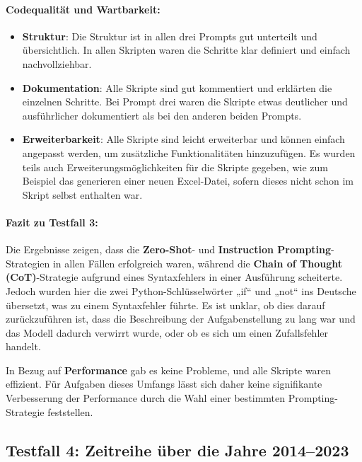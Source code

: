 \documentclass[11pt,a4paper]{article}
\begin{document}
\paragraph{Codequalität und Wartbarkeit:}
\begin{itemize}
    \item \textbf{Struktur}: Die Struktur ist in allen drei Prompts gut unterteilt und übersichtlich. In allen Skripten waren die Schritte klar definiert und einfach nachvollziehbar.
    \item \textbf{Dokumentation}: Alle Skripte sind gut kommentiert und erklärten die einzelnen Schritte. Bei Prompt drei waren die Skripte etwas deutlicher und ausführlicher dokumentiert als bei den anderen beiden Prompts.
    \item \textbf{Erweiterbarkeit}: Alle Skripte sind leicht erweiterbar und können einfach angepasst werden, um zusätzliche Funktionalitäten hinzuzufügen. Es wurden teils auch Erweiterungsmöglichkeiten für die Skripte gegeben, wie zum Beispiel das generieren einer neuen Excel-Datei, sofern dieses nicht schon im Skript selbst enthalten war. 
\end{itemize}

\paragraph{Fazit zu Testfall 3:}
Die Ergebnisse zeigen, dass die \textbf{Zero-Shot}- und \textbf{Instruction Prompting}-Strategien in allen Fällen erfolgreich waren, während die \textbf{Chain of Thought (CoT)}-Strategie aufgrund eines Syntaxfehlers in einer Ausführung scheiterte. Jedoch wurden hier die zwei Python-Schlüsselwörter „if“ und „not“ ins Deutsche übersetzt, was zu einem Syntaxfehler führte. Es ist unklar, ob dies darauf zurückzuführen ist, dass die Beschreibung der Aufgabenstellung zu lang war und das Modell dadurch verwirrt wurde, oder ob es sich um einen Zufallsfehler handelt.

In Bezug auf \textbf{Performance} gab es keine Probleme, und alle Skripte waren effizient. Für Aufgaben dieses Umfangs lässt sich daher keine signifikante Verbesserung der Performance durch die Wahl einer bestimmten Prompting-Strategie feststellen.

\subsection{Testfall 4: Zeitreihe über die Jahre 2014--2023}
\label{subsec:auswertung_testfall4}
\end{document}
